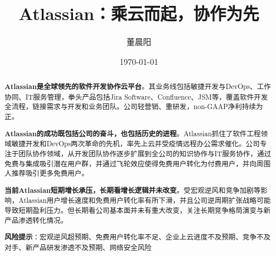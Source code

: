 \documentclass[a4paper,12pt]{ctexart}
\title{Atlassian：乘云而起，协作为先}
\author{董晨阳}
\date{\today}
\begin{document}
\maketitle
\begin{abstract}
    \textbf{Atlassian是全球领先的软件开发协作云平台}。其业务线包括敏捷开发与DevOps、工作协同、IT服务管理，拳头产品包括Jira Software、Confluence、JSM等，覆盖软件开发全流程，链接需求与开发和业务团队。公司轻营销、重研发，non-GAAP净利持续为正。

    \textbf{Atlassian的成功既包括公司的奋斗，也包括历史的进程}。Atlassian抓住了软件工程领域敏捷开发和DevOps两次革命的先机，率先上云并受疫情远程办公需求催化。公司专注于团队协作领域，从开发团队协作逐步扩展到全公司的知识协作与IT服务协作，通过免费与集成吸引潜在用户群，并通过飞轮效应使得免费用户转化为付费用户，并向周围人推荐吸引更多免费用户。

    \textbf{当前Atlassian短期增长承压，长期看增长逻辑并未改变}。受宏观逆风和竞争加剧等影响，Atlassian用户增长速度和免费用户转化率有所下滑，并且公司逆周期扩张战略可能导致短期盈利压力。但长期看公司基本面并未有重大改变，关注长期竞争格局演变与新产品渗透转化情况。

    \textbf{风险提示}：宏观逆风超预期、免费用户转化率不足、企业上云进度不及预期、竞争不及对手、新产品研发渗透不及预期、网络安全风险
\end{abstract}
\clearpage
\tableofcontents
\listoffigures
\clearpage





\end{document}
